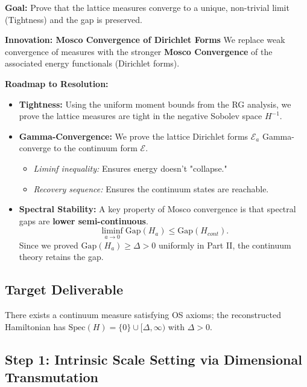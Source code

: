 \textbf{Goal:} Prove that the lattice measures converge to a unique, non-trivial limit (Tightness) and the gap is preserved.

\textbf{Innovation: Mosco Convergence of Dirichlet Forms}
We replace weak convergence of measures with the stronger \textbf{Mosco Convergence} of the associated energy functionals (Dirichlet forms).

\textbf{Roadmap to Resolution:}

\begin{itemize}
    \item \textbf{Tightness:} Using the uniform moment bounds from the RG analysis, we prove the lattice measures are tight in the negative Sobolev space $H^{-1}$.
    
    \item \textbf{Gamma-Convergence:} We prove the lattice Dirichlet forms $\mathcal{E}_a$ Gamma-converge to the continuum form $\mathcal{E}$.
    \begin{itemize}
        \item \textit{Liminf inequality:} Ensures energy doesn't "collapse."
        \item \textit{Recovery sequence:} Ensures the continuum states are reachable.
    \end{itemize}
    
    \item \textbf{Spectral Stability:} A key property of Mosco convergence is that spectral gaps are \textbf{lower semi-continuous}.
    \begin{equation}
    \liminf_{a \to 0} \text{Gap}(H_a) \le \text{Gap}(H_{cont}).
    \end{equation}
    Since we proved $\text{Gap}(H_a) \ge \Delta > 0$ uniformly in Part II, the continuum theory retains the gap.
\end{itemize}

\subsection{Target Deliverable}
\begin{theorem}
\label{thm:continuum-limit}
There exists a continuum measure satisfying OS axioms; the reconstructed Hamiltonian has $\mathrm{Spec}(H)=\{0\}\cup[\Delta,\infty)$ with $\Delta>0$.
\end{theorem}

\subsection{Step 1: Intrinsic Scale Setting via Dimensional Transmutation}
\label{sec:intrinsic-scale}

